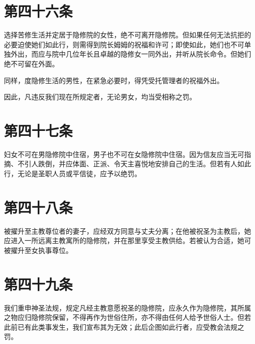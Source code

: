 
\section{第四十六条}

选择苦修生活并定居于隐修院的女性，绝不可离开隐修院。但如果任何无法抗拒的必要迫使她们如此行，则需得到院长姆姆的祝福和许可；即使如此，她们也不可单独外出，而应与院中几位年长且卓越的隐修女一同外出，并听从院长命令。但她们绝不可留在外面。\par

同样，度隐修生活的男性，在紧急必要时，得凭受托管理者的祝福外出。\par

因此，凡违反我们现在所规定者，无论男女，均当受相称之罚。\par


\section{第四十七条}

妇女不可在男隐修院中住宿，男子也不可在女隐修院中住宿。因为信友应当无可指摘、不引人跌倒，并应体面、正派、令天主喜悦地安排自己的生活。但若有人如此行，无论是圣职人员或平信徒，应予以绝罚。\par


\section{第四十八条}

被擢升至主教尊位者的妻子，应经双方同意与丈夫分离；在他被祝圣为主教后，她应进入一所远离主教寓所的隐修院，并在那里享受主教供给。若被认为合适，她可被擢升至女执事尊位。\par


\section{第四十九条}

我们重申神圣法规，规定凡经主教意愿祝圣的隐修院，应永久作为隐修院，其所属之物应归隐修院保留，不得再作为世俗住所，亦不得由任何人给予世俗人士。但若此前已有此类事发生，我们宣布其为无效；此后企图如此行者，应受教会法规之罚。\par

